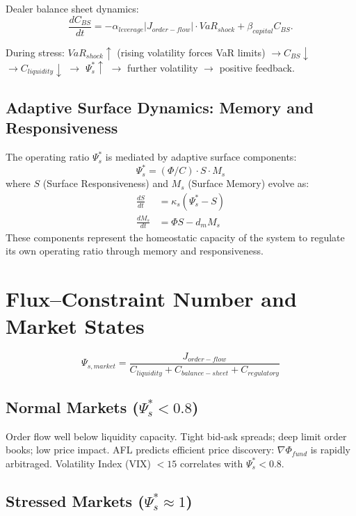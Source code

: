 \documentclass[11pt]{article}
\begin{document}
Dealer balance sheet dynamics:
\begin{equation}
\frac{dC_{BS}}{dt} = -\alpha_{leverage}|J_{order-flow}| \cdot VaR_{shock} + \beta_{capital} C_{BS}.
\end{equation}

During stress: $VaR_{shock} \uparrow$ (rising volatility forces VaR limits) $\to C_{BS} \downarrow$
$\to C_{liquidity} \downarrow$ $\to$ $\Psi_s^* \uparrow$ $\to$ further volatility $\to$ positive
feedback.

\subsection{Adaptive Surface Dynamics: Memory and Responsiveness}

The operating ratio $\Psi_s^*$ is mediated by adaptive surface components:
\begin{equation}
\Psi_s^* = (\Phi/C) \cdot S \cdot M_s
\end{equation}
where $S$ (Surface Responsiveness) and $M_s$ (Surface Memory) evolve as:
\begin{align}
\frac{dS}{dt} &= \kappa_s (\Psi_s^* - S) \\
\frac{dM_s}{dt} &= \Phi S - d_m M_s
\end{align}
These components represent the homeostatic capacity of the system to regulate its own operating ratio through memory and responsiveness.

\section{Flux--Constraint Number and Market States}

\begin{equation}
\Psi_{s,market} = \frac{J_{order-flow}}{C_{liquidity} + C_{balance-sheet} + C_{regulatory}}
\end{equation}

\subsection{Normal Markets ($\Psi_s^* < 0.8$)}

Order flow well below liquidity capacity. Tight bid-ask spreads; deep limit order books; low
price impact. AFL predicts efficient price discovery: $\nabla\Phi_{fund}$ is rapidly arbitraged.
Volatility Index (VIX) $< 15$ correlates with $\Psi_s^* < 0.8$.

\subsection{Stressed Markets ($\Psi_s^* \approx 1$)}
\end{document}
